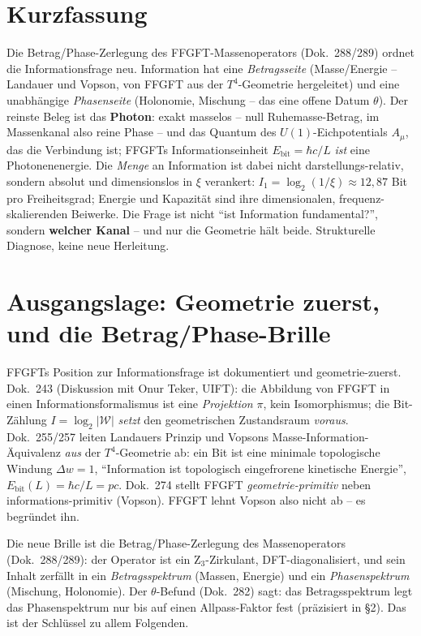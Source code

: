 \section*{Kurzfassung}
Die Betrag/Phase-Zerlegung des FFGFT-Massenoperators (Dok.~288/289) ordnet die Informationsfrage neu.
Information hat eine \emph{Betragsseite} (Masse/Energie -- Landauer und Vopson, von FFGFT aus der
$T^4$-Geometrie hergeleitet) und eine unabhängige \emph{Phasenseite} (Holonomie, Mischung -- das eine
offene Datum $\theta$). Der reinste Beleg ist das \textbf{Photon}: exakt masselos -- null Ruhemasse-Betrag, im Massenkanal also reine Phase -- und das
Quantum des $U(1)$-Eichpotentials $A_\mu$, das die Verbindung ist; FFGFTs Informationseinheit $E_\text{bit}=\hbar c/L$ \emph{ist}
eine Photonenenergie. Die \emph{Menge} an Information ist dabei nicht darstellungs-relativ, sondern
absolut und dimensionslos in $\xi$ verankert: $I_1=\log_2(1/\xi)\approx12{,}87$ Bit pro Freiheitsgrad;
Energie und Kapazität sind ihre dimensionalen, frequenz-skalierenden Beiwerke. Die Frage ist nicht
\enquote{ist Information fundamental?}, sondern \textbf{welcher Kanal} -- und nur die Geometrie hält
beide. Strukturelle Diagnose, keine neue Herleitung.

\section{Ausgangslage: Geometrie zuerst, und die Betrag/Phase-Brille}
FFGFTs Position zur Informationsfrage ist dokumentiert und geometrie-zuerst. Dok.~243 (Diskussion mit
Onur Teker, UIFT): die Abbildung von FFGFT in einen Informationsformalismus ist eine \emph{Projektion}
$\pi$, kein Isomorphismus; die Bit-Zählung $I=\log_2|\mathcal{W}|$ \emph{setzt} den geometrischen
Zustandsraum \emph{voraus}. Dok.~255/257 leiten Landauers Prinzip und Vopsons Masse-Information-Äquivalenz
\emph{aus} der $T^4$-Geometrie ab: ein Bit ist eine minimale topologische Windung $\Delta w=1$,
\enquote{Information ist topologisch eingefrorene kinetische Energie}, $E_\text{bit}(L)=\hbar c/L=pc$.
Dok.~274 stellt FFGFT \emph{geometrie-primitiv} neben informations-primitiv (Vopson). FFGFT lehnt Vopson
also nicht ab -- es begründet ihn.

Die neue Brille ist die Betrag/Phase-Zerlegung des Massenoperators (Dok.~288/289): der Operator ist ein
Z$_3$-Zirkulant, DFT-diagonalisiert, und sein Inhalt zerfällt in ein \emph{Betragsspektrum} (Massen,
Energie) und ein \emph{Phasenspektrum} (Mischung, Holonomie). Der $\theta$-Befund (Dok.~282) sagt: das
Betragsspektrum legt das Phasenspektrum nur bis auf einen Allpass-Faktor fest (präzisiert in §2). Das ist der Schlüssel zu allem Folgenden.

